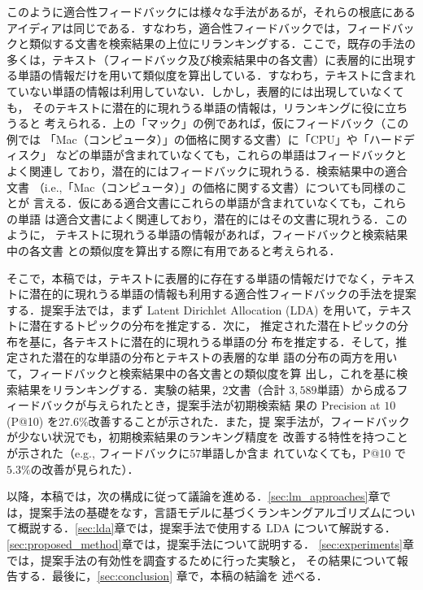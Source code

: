 \documentclass[japanese]{jnlp_1.4}
\begin{document}
このように適合性フィードバックには様々な手法があるが，それらの根底にある
アイディアは同じである．すなわち，適合性フィードバックでは，フィードバッ
クと類似する文書を検索結果の上位にリランキングする．ここで，既存の手法の
多くは，テキスト（フィードバック及び検索結果中の各文書）に表層的に出現す
る単語の情報だけを用いて類似度を算出している．すなわち，テキストに含まれ
ていない単語の情報は利用していない．しかし，表層的には出現していなくても，
そのテキストに潜在的に現れうる単語の情報は，リランキングに役に立ちうると
考えられる．上の「マック」の例であれば，仮にフィードバック（この例では
「Mac（コンピュータ）」の価格に関する文書）に「CPU」や「ハードディスク」
などの単語が含まれていなくても，これらの単語はフィードバックとよく関連し
ており，潜在的にはフィードバックに現れうる．検索結果中の適合文書
（i.e.,「Mac（コンピュータ）」の価格に関する文書）についても同様のことが
言える．仮にある適合文書にこれらの単語が含まれていなくても，これらの単語
は適合文書によく関連しており，潜在的にはその文書に現れうる．このように，
テキストに現れうる単語の情報があれば，フィードバックと検索結果中の各文書
との類似度を算出する際に有用であると考えられる．

そこで，本稿では，テキストに表層的に存在する単語の情報だけでなく，テキス
トに潜在的に現れうる単語の情報も利用する適合性フィードバックの手法を提案
する．提案手法では，まず Latent Dirichlet Allocation (LDA)
\cite{Blei2003}を用いて，テキストに潜在するトピックの分布を推定する．次に，
推定された潜在トピックの分布を基に，各テキストに潜在的に現れうる単語の分
布を推定する．そして，推定された潜在的な単語の分布とテキストの表層的な単
語の分布の両方を用いて，フィードバックと検索結果中の各文書との類似度を算
出し，これを基に検索結果をリランキングする．実験の結果，$2$文書（合計
$3,589$単語）から成るフィードバックが与えられたとき，提案手法が初期検索結
果の Precision at $10$ (P@10) を$27.6\%$改善することが示された．また，提
案手法が，フィードバックが少ない状況でも，初期検索結果のランキング精度を
改善する特性を持つことが示された（e.g., フィードバックに$57$単語しか含ま
れていなくても，P@10 で$5.3\%$の改善が見られた）．

以降，本稿では，次の構成に従って議論を進める．\ref{sec:lm_approaches}章で
は，提案手法の基礎をなす，言語モデルに基づくランキングアルゴリズムについ
て概説する．\ref{sec:lda}章では，提案手法で使用する LDA について解説する．
\ref{sec:proposed_method}章では，提案手法について説明する．
\ref{sec:experiments}章では，提案手法の有効性を調査するために行った実験と，
その結果について報告する．最後に，\ref{sec:conclusion} 章で，本稿の結論を
述べる．
\end{document}
